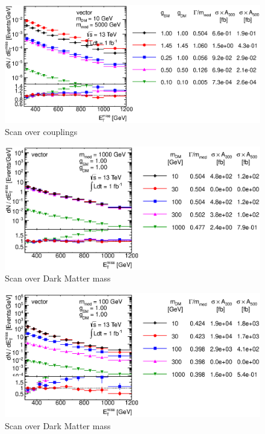 \begin{figure}
\centering
\includegraphics[width=0.9\linewidth]{figures/monojet/scan_g_V_10_5000.eps}
\caption{Scan over couplings}
\label{fig:monojet_narrow}
\end{figure}

\begin{figure}
\centering
\includegraphics[width=0.9\linewidth]{figures/monojet/scan_mDM_V_1000.eps}
\caption{Scan over Dark Matter mass}
\label{fig:monojet_scan_V_mDM1000}
\end{figure}

\begin{figure}
\centering
\includegraphics[width=0.9\linewidth]{figures/monojet/scan_mDM_V_100.eps}
\caption{Scan over Dark Matter mass}
\label{fig:monojet_scan_V_mDM100}
\end{figure}

